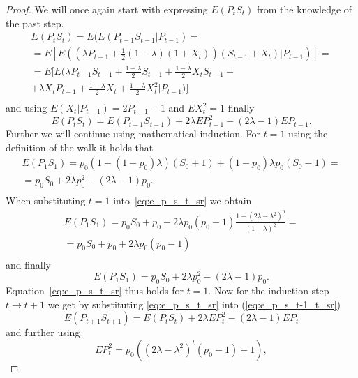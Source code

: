 \documentclass[runningheads]{CMSIM}
\begin{document}
    \begin{proof}
        We will once again start with expressing $E(P_{t}S_{t})$ from the
        knowledge of the past step.
        \begin{gather*}
            E(P_{t}S_{t})=E(E(P_{t-1}S_{t-1}|P_{t-1})=\\
            =E[E((\lambda P_{t-1}+\frac{1}{2}(1-\lambda)(1+X_{t}))(S_{t-1}+X_{t})|P_{t-1})]=\\
            =E[E(\lambda P_{t-1}S_{t-1}+\frac{1-\lambda}{2}S_{t-1}+\frac{1-\lambda}{2}X_{t}S_{t-1}+\\
                +\lambda X_{t}P_{t-1}+\frac{1-\lambda}{2}X_{t}+\frac{1-\lambda}{2}X_{t}^{2}|P_{t-1})]\\
        \end{gather*}
        and using $E(X_{t}|P_{t-1})=2P_{t-1}-1$ and $EX_{t}^{2}=1$ finally
        \begin{equation}
            E(P_{t}S_{t})=E(P_{t-1}S_{t-1})+2\lambda EP_{t-1}^{2}-(2\lambda-1)EP_{t-1}.\label{eq:e_p_s_t-1_t_sr}
        \end{equation}
        Further we will continue using mathematical induction.
        For $t=1$
        using the definition of the walk it holds that
        \begin{gather*}
            E(P_{1}S_{1})=p_{0}(1-(1-p_{0})\lambda)(S_{0}+1)+(1-p_{0})\lambda p_{0}(S_{0}-1)=\\
            =p_{0}S_{0}+2\lambda p_{0}^{2}-(2\lambda-1)p_{0}.\\
        \end{gather*}
        When substituting $t=1$ into~\eqref{eq:e_p_s_t_sr} we obtain
        \begin{gather*}
            E(P_{1}S_{1})=p_{0}S_{0}+p_{0}+2\lambda p_{0}(p_{0}-1)\frac{1-(2\lambda-\lambda^{2})^{0}}{(1-\lambda)^{2}}=\\
            =p_{0}S_{0}+p_{0}+2\lambda p_{0}(p_{0}-1)\\
        \end{gather*}
        and finally
        \[
            E(P_{1}S_{1})=p_{0}S_{0}+2\lambda p_{0}^{2}-(2\lambda-1)p_{0}.
        \]
        Equation~\eqref{eq:e_p_s_t_sr} thus holds for $t=1$.
        Now for the
        induction step $t\rightarrow t+1$ we get by substituting \eqref{eq:e_p_s_t_sr}
        into (\ref{eq:e_p_s_t-1_t_sr})
        \[
            E(P_{t+1}S_{t+1})=E(P_{t}S_{t})+2\lambda EP_{t}^{2}-(2\lambda-1)EP_{t}
        \]
        and further using
        \[
            EP_{t}^{2}=p_{0}((2\lambda-\lambda^{2})^{t}(p_{0}-1)+1),
\]
\end{proof}
\end{document}
